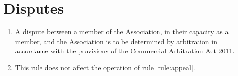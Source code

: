 \section{Disputes}
\label{rule:disputes}

\begin{enumerate}
	\item A dispute between a member of the Association, in their capacity as a member, and the Association is to be determined by arbitration in accordance with the provisions of the \href{https://www.legislation.tas.gov.au/view/html/inforce/current/act-2011-013}{Commercial Arbitration Act 2011}.
	\item This rule does not affect the operation of rule \ref{rule:appeal}.
\end{enumerate}